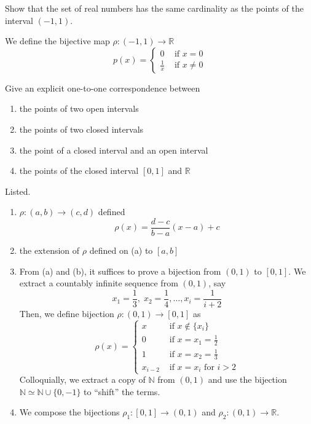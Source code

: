   \begin{exercise}[Zorich 2.4.1]
  Show that the set of real numbers has the same cardinality as the points of the interval $(-1, 1)$. 
  \end{exercise}
  \begin{solution}
    We define the bijective map $\rho: (-1, 1) \longrightarrow \mathbb{R}$ 
    \[p(x) = \begin{cases} 
    0 & \text{ if } x = 0 \\
    \frac{1}{x} & \text{ if } x \neq 0 
    \end{cases}\]
  \end{solution}

  \begin{exercise}[Zorich 2.4.2]
    Give an explicit one-to-one correspondence between 
    \begin{enumerate}
      \item the points of two open intervals 
      \item the points of two closed intervals 
      \item the point of a closed interval and an open interval 
      \item the points of the closed interval $[0, 1]$ and $\mathbb{R}$
    \end{enumerate}
  \end{exercise}
  \begin{solution}
    Listed. 
    \begin{enumerate}
      \item $\rho: (a, b) \longrightarrow (c, d)$ defined 
      \[\rho(x) = \frac{d - c}{b - a} (x - a) + c \]
      \item the extension of $\rho$ defined on (a) to $[a, b]$
      \item From (a) and (b), it suffices to prove a bijection from $(0, 1)$ to $[0, 1]$. We extract a countably infinite sequence from $(0, 1)$, say 
      \[x_1 = \frac{1}{3}, \; x_2 = \frac{1}{4}, \ldots, x_i = \frac{1}{i+2}\]
      Then, we define bijection $\rho: (0, 1) \longrightarrow [0, 1]$ as 
      \[\rho (x) = \begin{cases}
      x & \text{ if } x \not\in \{x_i\} \\
      0 & \text{ if } x = x_1 = \frac{1}{2} \\
      1 & \text{ if } x = x_2 = \frac{1}{3} \\
      x_{i-2} & \text{ if } x = x_i \text{ for } i > 2
      \end{cases}\]
      Colloquially, we extract a copy of $\mathbb{N}$ from $(0, 1)$ and use the bijection $\mathbb{N} \simeq \mathbb{N} \cup \{0, -1\}$ to ``shift'' the terms. 
      \item We compose the bijections $\rho_1 : [0, 1] \longrightarrow (0, 1)$ and $\rho_2: (0, 1) \longrightarrow \mathbb{R}$. 
    \end{enumerate}
  \end{solution}

